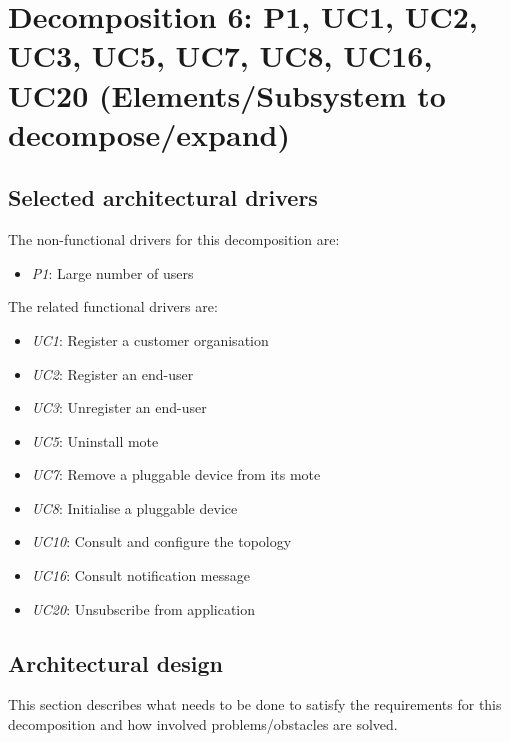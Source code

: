 \section{Decomposition 6: P1, UC1, UC2, UC3, UC5, UC7, UC8, UC16, UC20 (Elements/Subsystem to decompose/expand)}


\subsection{Selected architectural drivers}
    The non-functional drivers for this decomposition are:
    \begin{itemize}
    	\item \emph{P1}: Large number of users
    \end{itemize}

    The related functional drivers are:
    \begin{itemize}
        \item \emph{UC1}: Register a customer organisation \\
        \item \emph{UC2}: Register an end-user \\
        \item \emph{UC3}: Unregister an end-user \\
        \item \emph{UC5}: Uninstall mote \\
        \item \emph{UC7}: Remove a pluggable device from its mote \\
        \item \emph{UC8}: Initialise a pluggable device \\
        \item \emph{UC10}: Consult and configure the topology \\
        \item \emph{UC16}: Consult notification message \\
        \item \emph{UC20}: Unsubscribe from application \\
    \end{itemize}


\subsection{Architectural design}
    This section describes what needs to be done to satisfy the requirements for
    this decomposition and how involved problems/obstacles are solved.

